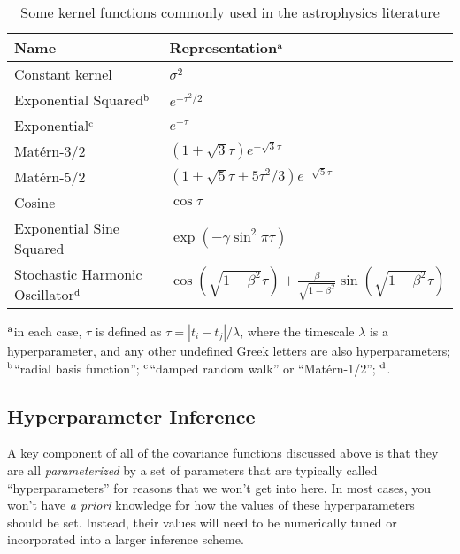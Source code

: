 \documentclass[letterpaper]{ar-1col}
\begin{document}
\begin{table}[ht]
  \caption{Some kernel functions commonly used in the astrophysics literature}
  \label{tab:kernels}
  \begin{center}
    \begin{tabular}{@{}l|l@{}}
      \hline
      Name                           &  Representation$^{\rm a}$                                    \\
      \hline
      Constant kernel                & $\sigma^2$                                                     \\
      Exponential Squared$^{\rm b}$  & $e^{-\tau^2/2}$                                              \\
      Exponential$^{\rm c}$          & $e^{-\tau}$                                                  \\
      Mat\'ern-3/2                   & $\left(1 + \sqrt{3}\tau\right)e^{-\sqrt{3}\tau}$             \\
      Mat\'ern-5/2                   & $\left(1 + \sqrt{5}\tau +5\tau^2/3\right)e^{-\sqrt{5}\tau}$  \\
      Cosine                         & $\cos \tau$                                                  \\
      Exponential Sine Squared       & $\exp\left(-\gamma\sin^2\pi\tau\right)$                      \\
      Stochastic Harmonic Oscillator$^{\rm d}$ & $\cos\left(\sqrt{1-\beta^2}\tau\right) + \frac{\beta}{\sqrt{1-\beta^2}}\sin\left(\sqrt{1-\beta^2}\tau\right)$                          \\
      \hline
    \end{tabular}
  \end{center}
  \begin{tabnote}
    $^{\rm a}$in each case, $\tau$ is defined as $\tau = \left|t_i - t_j\right| / \lambda$, where the timescale $\lambda$ is a hyperparameter, and any other undefined Greek letters are also hyperparameters;
    $^{\rm b}$``radial basis function'';
    $^{\rm c}$``damped random walk'' or ``Mat\'ern-1/2'';
    $^{\rm d}$\citet{celerite}.
  \end{tabnote}
\end{table}

\subsection{Hyperparameter Inference}

A key component of all of the covariance functions discussed above is that they are all \emph{parameterized} by a set of parameters that are typically called ``hyperparameters'' for reasons that we won't get into here.
In most cases, you won't have \emph{a priori} knowledge for how the values of these hyperparameters should be set.
Instead, their values will need to be numerically tuned or incorporated into a larger inference scheme.
\end{document}
